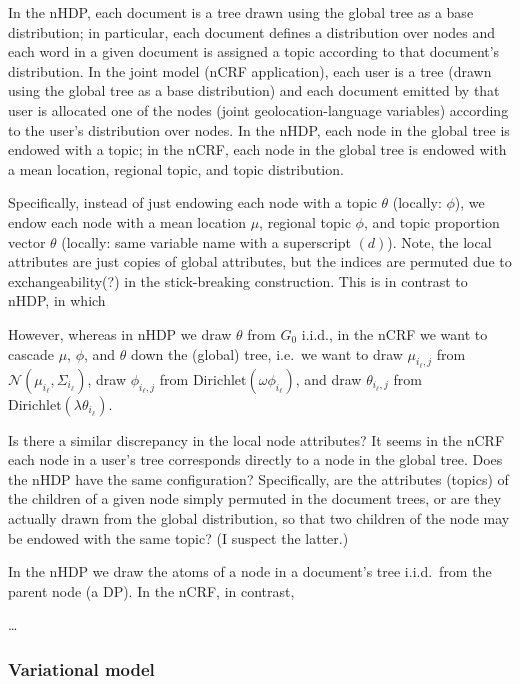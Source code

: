 \documentclass{article}
\newcommand{\Dirichlet}{\ensuremath{\mathrm{Dirichlet}}}
\newcommand{\Normal}{\ensuremath{\mathcal{N}}}
\begin{document}
In the nHDP, each document is a tree drawn using the global tree as a base distribution; in particular, each document defines a distribution over nodes and each word in a given document is assigned a topic according to that document's distribution.  In the joint model (nCRF application), each user is a tree (drawn using the global tree as a base distribution) and each document emitted by that user is allocated one of the nodes (joint geolocation-language variables) according to the user's distribution over nodes.  In the nHDP, each node in the global tree is endowed with a topic; in the nCRF, each node in the global tree is endowed with a mean location, regional topic, and topic distribution.

Specifically, instead of just endowing each node with a topic $\theta$ (locally: $\phi$), we endow each node with a mean location $\mu$, regional topic $\phi$, and topic proportion vector $\theta$ (locally: same variable name with a superscript $(d)$).  Note, the local attributes are just copies of global attributes, but the indices are permuted due to exchangeability(?) in the stick-breaking construction.  This is in contrast to nHDP, in which

However, whereas in nHDP we draw $\theta$ from $G_0$ i.i.d., in the nCRF we want to cascade $\mu$, $\phi$, and $\theta$ down the (global) tree, i.e.\ we want to draw $\mu_{i_\ell,j}$ from $\Normal(\mu_{i_\ell}, \Sigma_{i_\ell})$, draw $\phi_{i_\ell,j}$ from $\Dirichlet(\omega \phi_{i_\ell})$, and draw $\theta_{i_\ell,j}$ from $\Dirichlet(\lambda \theta_{i_\ell})$.

Is there a similar discrepancy in the local node attributes?  It seems in the nCRF each node in a user's tree corresponds directly to a node in the global tree.  Does the nHDP have the same configuration?  Specifically, are the attributes (topics) of the children of a given node simply permuted in the document trees, or are they actually drawn from the global distribution, so that two children of the node may be endowed with the same topic?  (I suspect the latter.)

In the nHDP we draw the atoms of a node in a document's tree i.i.d.\ from the parent node (a DP).  In the nCRF, in contrast,

\ldots


\subsubsection*{Variational model}





\end{document}
